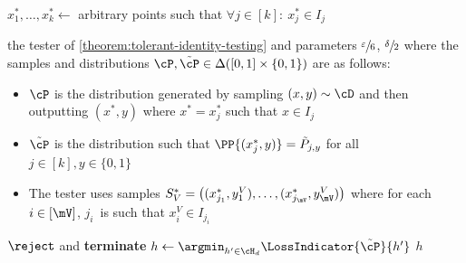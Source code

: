 \documentclass{toc}
\begin{document}
\begin{minipage}{\textwidth}
\begin{protocol}[H]
\begin{ShadedAlgorithmBox}
\begin{algorithmic}
			\vsp

			\State $x_1^*,\dots,x_k^* \gets$ arbitrary points such that $\forall j \in [k]: ~ x_j^* \in I_j$

			\vsp

			 the tester of \cref{theorem:tolerant-identity-testing} and parameters $\sfrac{\varepsilon}{6}$, $\sfrac{\delta}{2}$ where the samples and distributions $\cP,\tilde{\cP} \in \Delta([0,1] \times \{0,1\})$ are as follows:
			\vsp
			\begin{itemize}
				\item[-]{
					$\cP$ is the distribution generated by sampling $(x,y) \sim \cD$ and then outputting $(x^*,y)$ where $x^* = x_j^*$ such that $x \in I_j$
				}
				\item[-]{
					$\tilde{\cP}$ is the distribution such that $\PP{(x_j^*,y)} = \tilde{P}_{j,y}$ for all $j \in [k],y \in \{0,1\}$
				}
				\item[-]{
					The tester uses samples $S_V^* = 
					\left(
						(x_{j_1}^*,y_1^V),
						\dots,
						(x_{j_{\mV}}^*,y_{\mV}^V)
					\right)$ 
					where for each $i \in [\mV]$, $j_i$~is such that $x_{i}^V \in I_{j_i}$
				}
			\end{itemize}
			\vspp
				 $\reject$ and {\bfseries terminate} 
			\EndIf
			\vsp
			\State $h \gets \argmin_{h' \in \cH_d} \LossIndicator{\tilde{\cP}}{h'}$
			\vsp
			 $h$  
			
		\end{algorithmic}	
	\end{ShadedAlgorithmBox}
	\caption{Verification protocol for unions of $d$-intervals.}
	\label{protocol:union-of-intervals}
\end{protocol}
\end{minipage}
	
\end{document}
